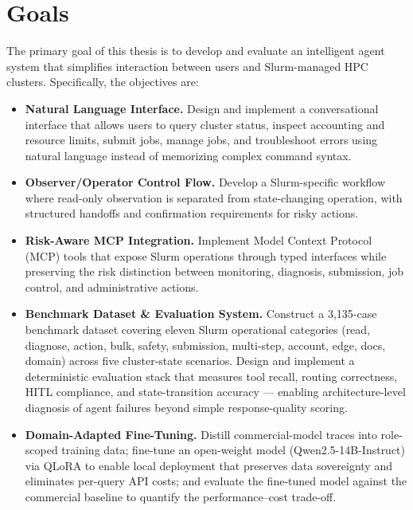 \section{Goals}

The primary goal of this thesis is to develop and evaluate an intelligent agent system that simplifies interaction between users and Slurm-managed HPC clusters. Specifically, the objectives are:

\begin{itemize}
    \item \textbf{Natural Language Interface.} Design and implement a conversational interface that allows users to query cluster status, inspect accounting and resource limits, submit jobs, manage jobs, and troubleshoot errors using natural language instead of memorizing complex command syntax.
    
    \item \textbf{Observer/Operator Control Flow.} Develop a Slurm-specific workflow where read-only observation is separated from state-changing operation, with structured handoffs and confirmation requirements for risky actions.
    
    \item \textbf{Risk-Aware MCP Integration.} Implement Model Context Protocol (MCP) tools that expose Slurm operations through typed interfaces while preserving the risk distinction between monitoring, diagnosis, submission, job control, and administrative actions.
    
    \item \textbf{Benchmark Dataset \& Evaluation System.} Construct a 3{,}135-case benchmark dataset covering eleven Slurm operational categories (read, diagnose, action, bulk, safety, submission, multi-step, account, edge, docs, domain) across five cluster-state scenarios. Design and implement a deterministic evaluation stack that measures tool recall, routing correctness, HITL compliance, and state-transition accuracy --- enabling architecture-level diagnosis of agent failures beyond simple response-quality scoring.

    \item \textbf{Domain-Adapted Fine-Tuning.} Distill commercial-model traces into role-scoped training data; fine-tune an open-weight model (Qwen2.5-14B-Instruct) via QLoRA to enable local deployment that preserves data sovereignty and eliminates per-query API costs; and evaluate the fine-tuned model against the commercial baseline to quantify the performance--cost trade-off.
    
\end{itemize}
